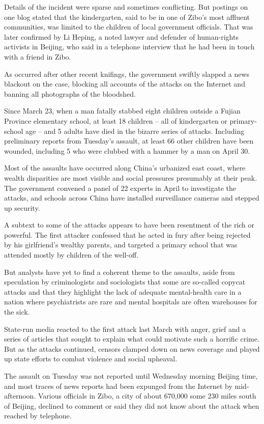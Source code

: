 ﻿\documentclass[12pt]{article}
\begin{document}
Details of the incident were sparse and sometimes conflicting. But postings on one blog stated that
the kindergarten, said to be in one of Zibo's most affluent communities, was limited to the children
of local government officials. That was later confirmed by Li Heping, a noted lawyer and defender of
human-rights activists in Beijing, who said in a telephone interview that he had been in touch with
a friend in Zibo.

As occurred after other recent knifings, the government swiftly slapped a news blackout on the case,
blocking all accounts of the attacks on the Internet and banning all photographs of the bloodshed.

Since March 23, when a man fatally stabbed eight children outside a Fujian Province elementary
school, at least 18 children -- all of kindergarten or primary-school age -- and 5 adults have died
in the bizarre series of attacks. Including preliminary reports from Tuesday's assault, at least 66
other children have been wounded, including 5 who were clubbed with a hammer by a man on April 30.

Most of the assaults have occurred along China's urbanized east coast, where wealth disparities are
most visible and social pressures presumably at their peak. The government convened a panel of 22
experts in April to investigate the attacks, and schools across China have installed surveillance
cameras and stepped up security.

A subtext to some of the attacks appears to have been resentment of the rich or powerful. The first
attacker confessed that he acted in fury after being rejected by his girlfriend's wealthy parents,
and targeted a primary school that was attended mostly by children of the well-off.

But analysts have yet to find a coherent theme to the assaults, aside from speculation by
criminologists and sociologists that some are so-called copycat attacks and that they highlight the
lack of adequate mental-health care in a nation where psychiatrists are rare and mental hospitals
are often warehouses for the sick.

State-run media reacted to the first attack last March with anger, grief and a series of articles
that sought to explain what could motivate such a horrific crime. But as the attacks continued,
censors clamped down on news coverage and played up state efforts to combat violence and social
upheaval.

The assault on Tuesday was not reported until Wednesday morning Beijing time, and most traces of
news reports had been expunged from the Internet by mid-afternoon. Various officials in Zibo, a city
of about 670,000 some 230 miles south of Beijing, declined to comment or said they did not know
about the attack when reached by telephone.
\end{document}
